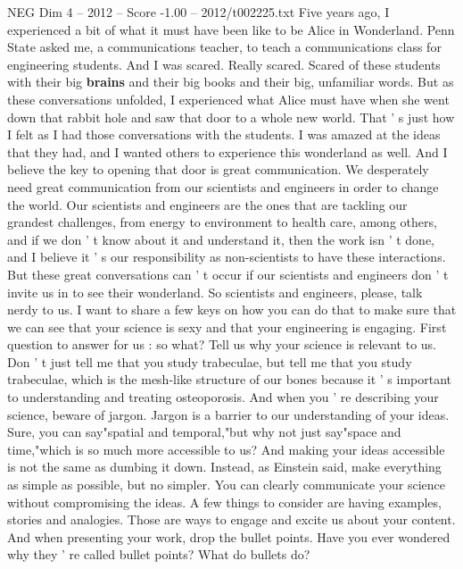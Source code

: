 \begin{textsample}{NEG Dim 4 – 2012 – Score -1.00 – 2012/t002225.txt}  \label{ex:f4_neg_013}
Five years ago, I experienced a bit of what it must have been like to be Alice in Wonderland.
Penn State asked me, a communications teacher, to teach a communications class for engineering students.
And I was scared.
Really scared.
Scared of these students with their big \textbf{brains} and their big books and their big, unfamiliar words.
But as these conversations unfolded, I experienced what Alice must have when she went down that rabbit hole and saw that door to a whole new world.
That ' s just how I felt as I had those conversations with the students.
I was amazed at the ideas that they had, and I wanted others to experience this wonderland as well.
And I believe the key to opening that door is great communication.
We desperately need great communication from our scientists and engineers in order to change the world.
Our scientists and engineers are the ones that are tackling our grandest challenges, from energy to environment to health care, among others, and if we don ' t know about it and understand it, then the work isn ' t done, and I believe it ' s our responsibility as non-scientists to have these interactions.
But these great conversations can ' t occur if our scientists and engineers don ' t invite us in to see their wonderland.
So scientists and engineers, please, talk nerdy to us.
I want to share a few keys on how you can do that to make sure that we can see that your science is sexy and that your engineering is engaging.
First question to answer for us : so what?
Tell us why your science is relevant to us.
Don ' t just tell me that you study trabeculae, but tell me that you study trabeculae, which is the mesh-like structure of our bones because it ' s important to understanding and treating osteoporosis.
And when you ' re describing your science, beware of jargon.
Jargon is a barrier to our understanding of your ideas.
Sure, you can say"spatial and temporal,"but why not just say"space and time,"which is so much more accessible to us?
And making your ideas accessible is not the same as dumbing it down.
Instead, as Einstein said, make everything as simple as possible, but no simpler.
You can clearly communicate your science without compromising the ideas.
A few things to consider are having examples, stories and analogies.
Those are ways to engage and excite us about your content.
And when presenting your work, drop the bullet points.
Have you ever wondered why they ' re called bullet points?
What do bullets do?

\end{textsample}
